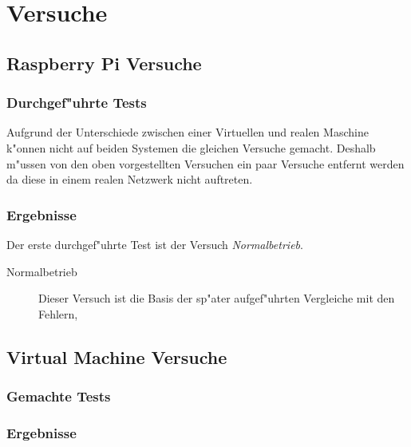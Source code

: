 \chapter{Versuche}
\label{cha:versuche}

\section{Raspberry Pi Versuche}
\label{sec:raspberryPiVersuche}
\subsection{Durchgef"uhrte Tests}
Aufgrund der Unterschiede zwischen einer Virtuellen und realen Maschine k"onnen nicht auf beiden Systemen  %
die gleichen Versuche gemacht. Deshalb m"ussen von den oben vorgestellten Versuchen ein paar Versuche entfernt %
werden da diese in einem realen Netzwerk nicht auftreten.  
\subsection{Ergebnisse}
Der erste durchgef"uhrte Test ist der Versuch \emph{Normalbetrieb}. 
\begin{description}
\item[Normalbetrieb]Dieser Versuch ist die Basis der sp"ater aufgef"uhrten Vergleiche mit den Fehlern, %
\end{description}

\section{Virtual Machine Versuche}
\label{sec:VMVersuche}
\subsection{Gemachte Tests}
\subsection{Ergebnisse}


